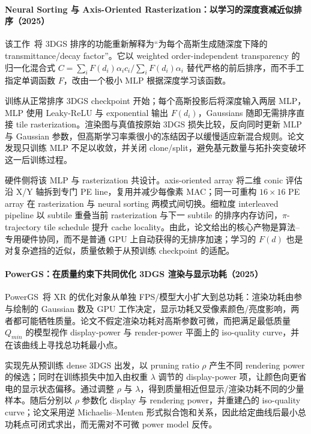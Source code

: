 \paragraph{Neural Sorting 与 Axis-Oriented Rasterization：以学习的深度衰减近似排序（2025）\cite{2506_07069}}
该工作~\cite{2506_07069}将 3DGS 排序的功能重新解释为“为每个高斯生成随深度下降的 transmittance/decay factor”。它以 weighted order-independent transparency 的归一化混合式 $C=\sum_iF(d_i)\alpha_ic_i/\sum_iF(d_i)\alpha_i$ 替代严格的前后排序，而不手工指定单调函数 $F$，改由一个极小 MLP 根据深度学习该函数。

训练从正常排序 3DGS checkpoint 开始；每个高斯投影后将深度输入两层 MLP，MLP 使用 Leaky-ReLU 与 exponential 输出 $F(d_i)$，Gaussians 随即无需排序直接 tile rasterization。渲染图与真值按原始 3DGS 损失比较，反向同时更新 MLP 与 Gaussian 参数，但高斯学习率乘很小的冻结因子以缓慢适应新混合规则。论文发现只训练 MLP 不足以收敛，并关闭 clone/split，避免基元数量与拓扑突变破坏这一后训练过程。

硬件侧将该 MLP 与 rasterization 共设计。axis-oriented array 将二维 conic 评估沿 X/Y 轴拆到专门 PE line，复用并减少每像素 MAC；同一可重构 $16\times16$ PE array 在 rasterization 与 neural sorting 两模式间切换。细粒度 interleaved pipeline 以 subtile 重叠当前 rasterization 与下一 subtile 的排序内存访问，$\pi$-trajectory tile schedule 提升 cache locality。由此，论文给出的核心产物是算法--专用硬件协同，而不是普通 GPU 上自动获得的无排序加速；学习的 $F(d)$ 也是对复杂遮挡的近似，质量依赖于从预训练 checkpoint 的适配。

\paragraph{PowerGS：在质量约束下共同优化 3DGS 渲染与显示功耗（2025）\cite{2509_21702}}
PowerGS~\cite{2509_21702}将 XR 的优化对象从单独 FPS/模型大小扩大到总功耗：渲染功耗由参与绘制的 Gaussian 数及 GPU 工作决定，显示功耗又受像素颜色/亮度影响，两者都可能牺牲质量。论文不假定渲染功耗对高斯参数可微，而把满足最低质量 $Q_{min}$ 的模型视作 display-power 与 render-power 平面上的 iso-quality curve，并在该曲线上寻找总功耗最小点。

实现先从预训练 dense 3DGS 出发，以 pruning ratio $\rho$ 产生不同 rendering power 的候选；同时在训练损失中加入由权重 $\lambda$ 调节的 display-power 项，让颜色向更省电的显示状态偏移。通过调整 $\rho$ 与 $\lambda$，得到质量相近但显示/渲染功耗不同的少量样本。随后分别以 $\rho$ 参数化 display 与 rendering power，并重建凸的 iso-quality curve；论文采用逆 Michaelis--Menten 形式拟合饱和关系，因此给定曲线后最小总功耗点可闭式求出，而无需对不可微 power model 反传。

